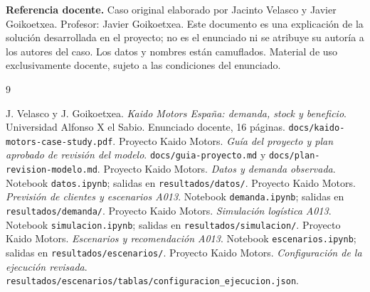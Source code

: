 \documentclass[11pt,a4paper,twoside]{article}
\newcommand{\archivo}[1]{\nolinkurl{#1}}
\begin{document}
\vfill
\noindent\footnotesize
\textbf{Referencia docente.} Caso original elaborado por Jacinto Velasco y
Javier Goikoetxea. Profesor: Javier Goikoetxea. Este documento es una explicación
de la solución desarrollada en el proyecto; no es el enunciado ni se atribuye su
autoría a los autores del caso. Los datos y nombres están camuflados. Material de
uso exclusivamente docente, sujeto a las condiciones del enunciado.
\normalsize
\clearpage
\tableofcontents
\clearpage









\clearpage
\begin{thebibliography}{9}
 J. Velasco y J. Goikoetxea.
\emph{Kaido Motors España: demanda, stock y beneficio}.
Universidad Alfonso X el Sabio. Enunciado docente, 16 páginas.
\archivo{docs/kaido-motors-case-study.pdf}.
 Proyecto Kaido Motors.
\emph{Guía del proyecto y plan aprobado de revisión del modelo}.
\archivo{docs/guia-proyecto.md} y \archivo{docs/plan-revision-modelo.md}.
 Proyecto Kaido Motors.
\emph{Datos y demanda observada}. Notebook \archivo{datos.ipynb};
salidas en \archivo{resultados/datos/}.
 Proyecto Kaido Motors.
\emph{Previsión de clientes y escenarios A013}. Notebook \archivo{demanda.ipynb};
salidas en \archivo{resultados/demanda/}.
 Proyecto Kaido Motors.
\emph{Simulación logística A013}. Notebook \archivo{simulacion.ipynb};
salidas en \archivo{resultados/simulacion/}.
 Proyecto Kaido Motors.
\emph{Escenarios y recomendación A013}. Notebook \archivo{escenarios.ipynb};
salidas en \archivo{resultados/escenarios/}.
 Proyecto Kaido Motors.
\emph{Configuración de la ejecución revisada}.
\archivo{resultados/escenarios/tablas/configuracion_ejecucion.json}.
\end{thebibliography}
\end{document}
